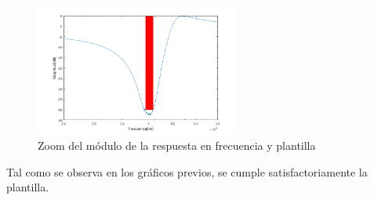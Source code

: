 \documentclass[../../tc_tp5_main.tex]{subfiles}
\begin{document}
\begin{figure}[H]	
	\centering
	\includegraphics[width=0.6\textwidth]{imagenes/Zmagplant.png}
	\caption{Zoom del m\'odulo de la respuesta en frecuencia y plantilla}
\end{figure}

Tal como se observa en los gráficos previos, se cumple satisfactoriamente la plantilla.



\clearpage\newpage
\end{document}
